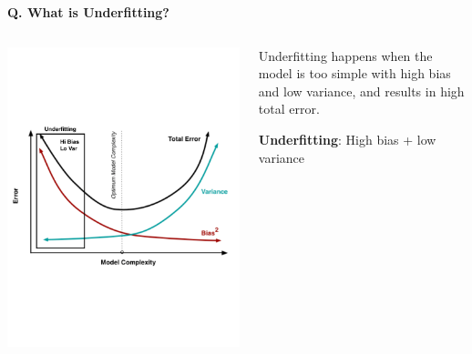 \begin{frame}[fragile]{\textbf{Q. What is Underfitting?}}
\begin{columns}[T]
\begin{column}{.58\textwidth}
{{        \includegraphics{figures/underfit.pdf}
      }
    }
  \end{column}
  \hfill
  \begin{column}{.4\textwidth}
    \footnotesize
    \begin{wideitemize}
      \item<1-> Underfitting happens when the model is too simple with high bias
      and low variance, and results in high total error.
      \item<2-> \textbf{Underfitting}: High bias + low variance
    \end{wideitemize}
    \end{column}
  \end{columns}
\end{frame}

